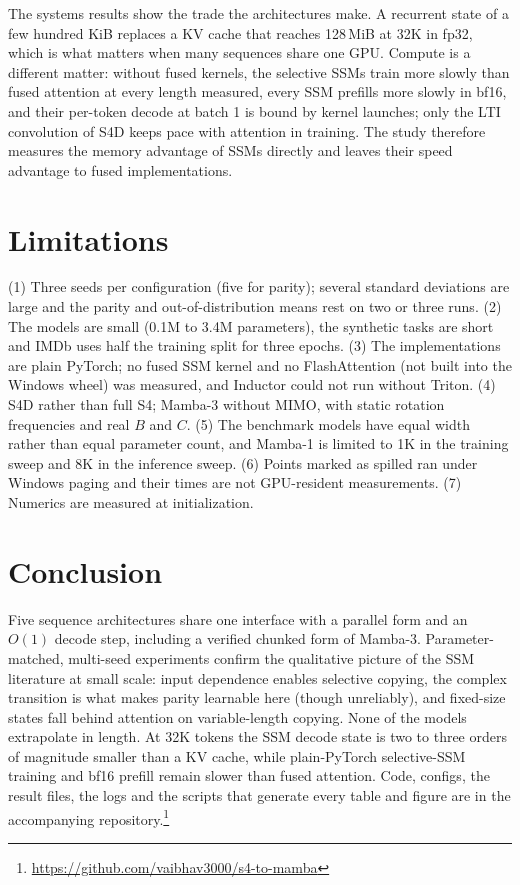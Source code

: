 \documentclass[conference]{IEEEtran}
\newcommand{\mamba}{Mamba}
\begin{document}
The systems results show the trade the architectures make. A recurrent
state of a few hundred KiB replaces a KV cache that reaches 128\,MiB at 32K
in fp32, which is what matters when many sequences share one GPU. Compute
is a different matter: without fused kernels, the selective SSMs train
more slowly than fused attention at every length measured, every SSM
prefills more slowly in bf16, and their per-token decode at batch 1 is bound
by kernel launches; only the LTI convolution of S4D keeps pace with
attention in training. The study
therefore measures the memory advantage of SSMs directly and leaves their
speed advantage to fused implementations.

\section{Limitations}
(1) Three seeds per configuration (five for parity); several standard
deviations are large and the parity and out-of-distribution means rest on
two or three runs.
(2) The models are small (0.1M to 3.4M parameters), the synthetic tasks
are short and IMDb uses half the training split for three epochs.
(3) The implementations are plain PyTorch; no fused SSM kernel and no
FlashAttention (not built into the Windows wheel) was measured, and
Inductor could not run without Triton. (4) S4D rather than full S4;
\mamba{}-3 without MIMO, with static rotation frequencies and real $B$ and
$C$. (5) The benchmark models have equal width rather than equal parameter
count, and \mamba{}-1 is limited to 1K in the training sweep and 8K in the
inference sweep. (6) Points marked as spilled ran under Windows paging and
their times are not GPU-resident measurements. (7) Numerics are measured at
initialization.

\section{Conclusion}
Five sequence architectures share one interface with a parallel form and
an $O(1)$ decode step, including a verified chunked form of \mamba{}-3.
Parameter-matched, multi-seed experiments confirm the qualitative picture
of the SSM literature at small scale: input dependence enables selective
copying, the complex transition is what makes parity learnable here
(though unreliably), and fixed-size states fall behind attention on
variable-length copying. None of the models extrapolate in length. At 32K
tokens the SSM decode state is two to three orders of magnitude smaller
than a KV cache, while plain-PyTorch selective-SSM training and bf16
prefill remain slower than fused attention. Code, configs, the result files, the logs and the
scripts that generate every table and figure are in the accompanying
repository.\footnote{\url{https://github.com/vaibhav3000/s4-to-mamba}}
\end{document}
